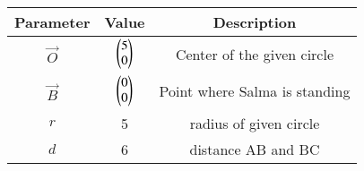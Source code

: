 
\begin{tabular}[]{|c|c|c|}
\hline
Parameter	& Value		& Description\\ \hline
$\vec{O}$	& $\begin{pmatrix}5\\0\end{pmatrix}$ &Center of the given circle \\ \hline
$\vec{B}$	& $\begin{pmatrix}0\\0\end{pmatrix}$ &Point where Salma is standing\\ \hline
$r$		& 5 & radius of given circle \\ \hline
$d$ 		& 6 & distance AB and BC\\ \hline
\end{tabular}
